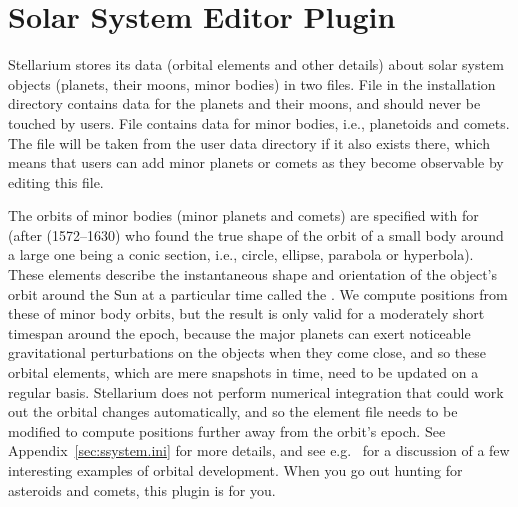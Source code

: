 \newpage



\newpage

\section{Solar System Editor Plugin}
\label{sec:plugins:SolarSystemEditor}

Stellarium stores its data (orbital elements and other details) about
solar system objects (planets, their moons, minor bodies) in two files.  
File  in the installation directory contains data for the planets and their moons, and should never be touched by users.
File  contains data for minor bodies, i.e., planetoids and comets.
The file will be taken from the user data directory if it also exists there, which means that users can add minor planets or comets as they become observable by editing this file.

The orbits of minor bodies (minor planets and comets) are specified with  for 
 (after  (1572--1630) who found the true shape of the orbit 
of a small body around a large one being a conic section, i.e., circle, ellipse, parabola or hyperbola). These elements 
describe the instantaneous shape and orientation of the object's orbit around the Sun at a particular time 
called the .  
We compute positions from these  of minor body orbits, but the result is only valid for 
a moderately short timespan around the epoch, because the major planets can exert noticeable gravitational perturbations 
on the objects when they come close, and so these orbital elements, which are mere snapshots in time, need to be updated on a regular basis. 
Stellarium does not perform numerical integration that could work out the orbital changes automatically, 
and so the element file needs to be modified to compute positions further away from the orbit's epoch. 
See Appendix~\ref{sec:ssystem.ini} for more details, 
and see e.g.\ \citet{Meeus:Morsels4} for a discussion of a few interesting examples of orbital development.
When you go out hunting for asteroids and comets, this plugin is for you.

